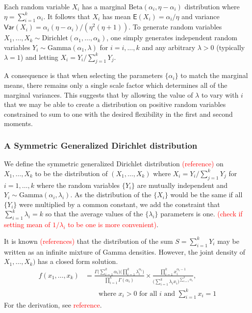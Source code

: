 \documentclass[useAMS,usenatbib]{biom}
\newcommand{\falta}[1]{\textcolor{red}{#1}}
\begin{document}
Each random variable $X_i$ has a marginal
$\text{Beta}(\alpha_i,\eta-\alpha_i)$ distribution where $\eta =
\sum_{i=1}^k \alpha_i$.  It follows that $X_i$ has mean
$\mathsf{E}(X_i) = \alpha_i/\eta$ and variance $\mathsf{Var}(X_i) =
\alpha_i(\eta-\alpha_i) / ( \eta^2(\eta+1) )$.  To generate
random variables $X_1,\ldots,X_k \sim
\text{Dirichlet}(\alpha_1,\ldots,\alpha_k)$, one simply generates
independent random variables $Y_i \sim \text{Gamma}(\alpha_1,\lambda)$
for $i=i,\ldots,k$ and any arbitrary $\lambda>0$ (typically
$\lambda=1$) and letting $X_i = Y_i / \sum_{j=1}^k Y_j$.

A consequence is that when selecting the parameters $\{\alpha_i\}$ to
match the marginal means, there remains only a single scale factor
which determines all of the marginal variances. This
suggests that by allowing the value of $\lambda$ to vary with $i$ that
we may be able to create a distribution on positive random variables
constrained to sum to one with the desired flexibility in the first
and second moments.

\subsubsection{A Symmetric Generalized Dirichlet distribution}

We define the symmetric generalized Dirichlet distribution
\falta{(reference)} on $X_1,\ldots,X_k$ to be the distribution of
$(X_1,\ldots,X_k)$ where $X_i = Y_i \big/ \sum_{j=1}^k Y_j$ for
$i=1,\ldots,k$ where the random variables $\{Y_i\}$ are mutually
independent and $Y_i \sim \text{Gamma}(\alpha_i,\lambda_i)$.  As the
distribution of the $\{X_i\}$ would be the same if all $\{Y_i\}$ were
multiplied by a common constant, we add the constraint that
$\sum_{i=1}^k \lambda_i = k$ so that the average values of the
$\{\lambda_i\}$ parameters is one.  \falta{(check if setting mean of
  $1/\lambda_i$ to be one is more convenient)}.

It is known \falta{(references)} that the distribution of the sum $S =
\sum_{i=1}^k Y_i$ may be written as an infinite mixture of Gamma
densities.  However, the joint density of $X_1,\ldots,X_k)$ has a
closed form solution.
\begin{eqnarray*}
  f(x_1,\ldots,x_k) &= \frac{\Gamma\big(\sum_{i=1}^k
    \alpha_i\big)\big(\prod_{i=1}^k
    \lambda_i^{\alpha_i}\big)}{\prod_{i=1}^k \Gamma(\alpha_i)}
  \times \frac{\prod_{i=1}^k x_i^{\alpha_i - 1}}{\big(\sum_{i=1}^k
    \lambda_i x_i\big)^{\sum_{i=1}^k \alpha_i}},\\
  & \qquad \text{where
    $x_i > 0$ for all $i$ and $\sum_{i=1}^k x_i = 1$}
\end{eqnarray*}
For the derivation, see \falta{reference}.
\end{document}

